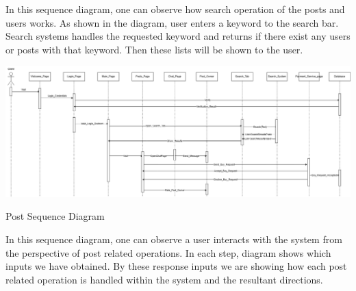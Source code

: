    In this sequence diagram, one can observe how search operation of the posts and users works. As shown in the diagram, user enters a keyword to the search bar. Search systems handles the requested keyword and returns if there exist any users or posts with that keyword. Then these lists will be shown to the user.

\begin{center} 
    \includegraphics[scale = 0.3]{SequenceDiagram_Post.png}
    \caption{Post Sequence Diagram}
\end{center}

In this sequence diagram, one can observe a user interacts with the system from the perspective of post related operations. In each step, diagram shows which inputs we have obtained. By these response inputs we are showing how each post related operation is handled within the system and the resultant directions.
